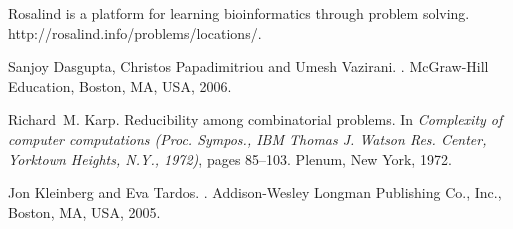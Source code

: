 \documentclass[11pt]{article}
\begin{document}
\begin{enumerate}
\begin{enumerate}
\pagebreak
\renewcommand\refname{Bibliografia}
\begin{thebibliography}{1}

Rosalind is a platform for learning bioinformatics through problem
solving.
\newblock http://rosalind.info/problems/locations/.

Sanjoy Dasgupta, Christos Papadimitriou and Umesh Vazirani.
.
\newblock McGraw-Hill Education, Boston, MA, USA, 2006.

Richard~M. Karp.
\newblock Reducibility among combinatorial problems.
\newblock In {\em Complexity of computer computations ({P}roc.
{S}ympos., {IBM}
  {T}homas {J}. {W}atson {R}es. {C}enter, {Y}orktown {H}eights,
  {N}.{Y}.,
  1972)}, pages 85--103. Plenum, New York, 1972.

Jon Kleinberg and Eva Tardos.
.
\newblock Addison-Wesley Longman Publishing Co., Inc., Boston, MA, USA,
2005.

\end{thebibliography}
\end{enumerate}
\end{enumerate}
\end{document}
